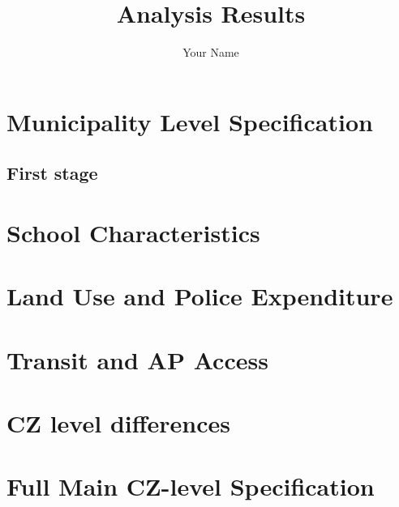 \documentclass{article}
\begin{document}
\title{Analysis Results}
\author{Your Name}
\date{}

\maketitle

\section{Municipality Level Specification}
\subsection{First stage}







\section{School Characteristics}







\section{Land Use and Police Expenditure}




\section{Transit and AP Access}





\section{CZ level differences}



\section{Full Main CZ-level Specification}


\end{document}
